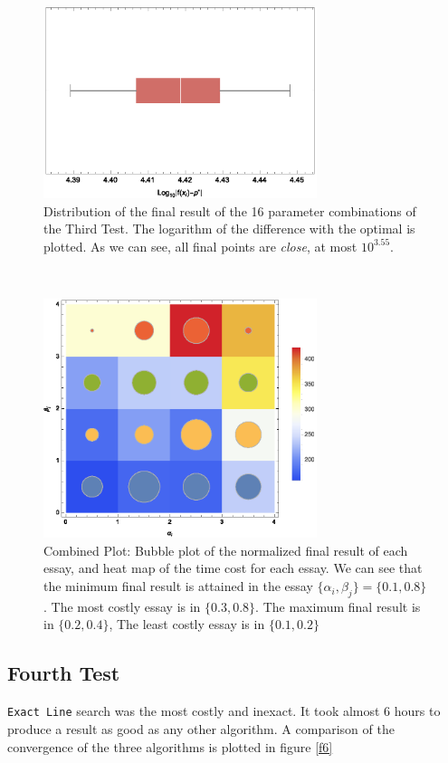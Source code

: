 \documentclass[a4paper,8pt,twocolumn]{article}
\begin{document}
\begin{figure}[!ht]
\begin{center}
\includegraphics[width=8cm]{f4.eps}
\caption{\footnotesize{Distribution of the final result of the 16 parameter combinations of the Third Test. The logarithm of the difference with the optimal is plotted. As we can see, all final points are \emph{close}, at most $10^{3.55}$.}\label{f4}}
\end{center}
\end{figure}
\,
\begin{figure}[!ht]
\begin{center}
\includegraphics[width=8cm]{f5.eps}
\caption{\footnotesize{Combined Plot: Bubble plot of the normalized final result of each essay, and heat map of the time cost for each essay. We can see that the minimum final result is attained in the essay $\{\alpha_i,\beta_j\}=\{0.1,0.8\}$. The most costly essay is in $\{0.3,0.8\}$. The maximum final result is in $\{0.2,0.4\}$, The least costly essay is in $\{0.1,0.2\}$}\label{f5}}
\end{center}
\end{figure}

\subsection*{Fourth Test}
\texttt{Exact Line} search was the most costly and inexact. It took almost 6 hours to produce a result as good as any other algorithm. A comparison of the convergence of the three algorithms is plotted in figure \ref{f6}
\end{document}
